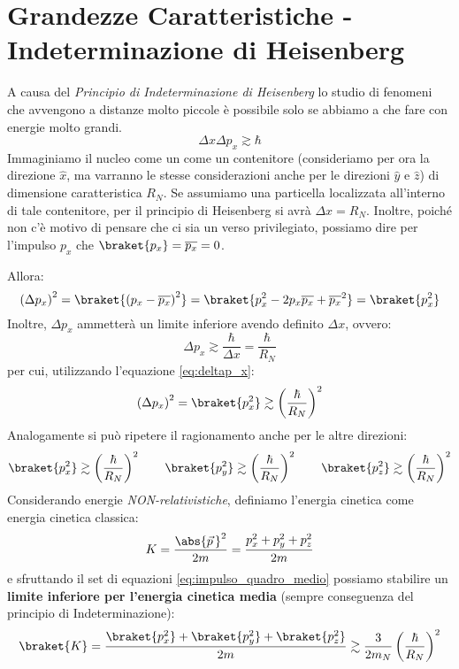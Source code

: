 \section{Grandezze Caratteristiche - Indeterminazione di Heisenberg}
A causa del \textit{Principio di Indeterminazione di Heisenberg} lo studio di
fenomeni che avvengono a distanze molto piccole è possibile solo se abbiamo a
che fare con energie molto grandi.
\begin{equation}
	\Delta x \Delta p_x \gtrsim \hbar
\end{equation}
Immaginiamo il nucleo come un come un contenitore (consideriamo per ora la
direzione $\hat{x}$, ma varranno le stesse considerazioni anche per le
direzioni $\hat{y}$ e $\hat{z}$) di dimensione caratteristica $R_N$. Se
assumiamo una particella localizzata all'interno di tale contenitore, per il
principio di Heisenberg si avrà $\Delta x = R_N$. Inoltre, poiché non c'è
motivo di pensare che ci sia un verso privilegiato, possiamo dire per l'impulso
$p_x$ che $\braket{p_x} = \overline{p_x} = 0$.

Allora:
\begin{equation}
	\left(\Delta p_x\right)^2 = \braket{\left(p_x - \overline{p_x}\right)^2} =
	\braket{p_x^2 - 2p_x\overline{p_x} + \overline{p_x}^2} = \braket{p_x^2}
	\label{eq:deltap_x}
\end{equation}
Inoltre, $\Delta p_x$ ammetterà un limite inferiore avendo definito $\Delta x$,
ovvero:
\begin{equation}
	\Delta p_x \gtrsim \frac{\hbar}{\Delta x} = \frac{\hbar}{R_N}
\end{equation}
per cui, utilizzando l'equazione \ref{eq:deltap_x}:
\begin{equation}
	\left(\Delta p_x\right)^2 = \braket{p_x^2} \gtrsim
	\left(\frac{\hbar}{R_N}\right)^2
\end{equation}
Analogamente si può ripetere il ragionamento anche per le altre direzioni:
\begin{equation}
	\braket{p_x^2} \gtrsim \left(\frac{\hbar}{R_N}\right)^2
	\qquad
	\braket{p_y^2} \gtrsim \left(\frac{\hbar}{R_N}\right)^2
	\qquad
	\braket{p_z^2} \gtrsim \left(\frac{\hbar}{R_N}\right)^2
	\label{eq:impulso_quadro_medio}
\end{equation}
Considerando energie \textit{NON-relativistiche}, definiamo l'energia cinetica
come energia cinetica classica:
\begin{equation}
	K = \frac{\abs{\vec{p}\,}^2}{2m} = \frac{p_x^2 + p_y^2 + p_z^2}{2m}
\end{equation}
e sfruttando il set di equazioni \ref{eq:impulso_quadro_medio} possiamo
stabilire un \textbf{limite inferiore
	per l'energia cinetica media} (sempre conseguenza del principio di
Indeterminazione):
\begin{equation}
	\braket{K} = \frac{\braket{p_x^2} + \braket{p_y^2} + \braket{p_z^2}}{2m}
	\gtrsim \frac{3}{2m_N} \left(\frac{\hbar}{R_N}\right)^2
\end{equation}

